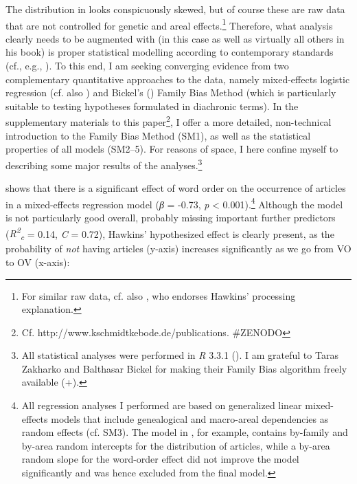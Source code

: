 \documentclass[output=paper]{langsci/langscibook}
\begin{document}
The distribution in  looks conspicuously skewed, but of course these are raw data that are not controlled for genetic and areal effects.\footnote{For similar raw data, cf. also \citet{Dryer2009}, who endorses Hawkins’ processing explanation.} Therefore, what  analysis clearly needs to be augmented with (in this case as well as virtually all others in his book) is proper statistical modelling according to contemporary standards (cf., e.g., \citealt{Bickel2011}). To this end, I am seeking converging evidence from two complementary quantitative approaches to the data, namely mixed-effects logistic regression (cf. also \citealt{Cysouw2010,JaegerEtAl2011}) and Bickel’s (\citeyear{Bickel2011,Bickel2013}) Family Bias Method (which is particularly suitable to testing hypotheses formulated in diachronic terms). In the supplementary materials to this paper\footnote{Cf. http://www.kschmidtkebode.de/publications. \#ZENODO}, I offer a more detailed, non-technical introduction to the Family Bias Method (SM1), as well as the statistical properties of all models (SM2–5). For reasons of space, I here confine myself to describing some major results of the analyses.\footnote{All statistical analyses were performed in \textit{R} 3.3.1 (\citealt{RTeam2016}). I am grateful to Taras Zakharko and Balthasar Bickel for making their Family Bias algorithm freely available (\citealt{ZakharkoBickel2011}+).}

 shows that there is a significant effect of word order on the occurrence of articles in a mixed-effects regression model (\textit{β} = -0.73, \textit{p} < 0.001).\footnote{All regression analyses I performed are based on generalized linear mixed-effects models that include genealogical and macro-areal dependencies as random effects (cf. SM3). The model in , for example, contains by-family and by-area random intercepts for the distribution of articles, while a by-area random slope for the word-order effect did not improve the model significantly and was hence excluded from the final model.} Although the model is not particularly good overall, probably missing important further predictors (\textit{R\textsuperscript{2}}\textit{\textsubscript{c}} = 0.14, \textit{C} = 0.72), Hawkins’ hypothesized effect is clearly present, as the probability of \textit{not} having articles (y-axis) increases significantly as we go from VO to OV (x-axis):

  
\end{document}
